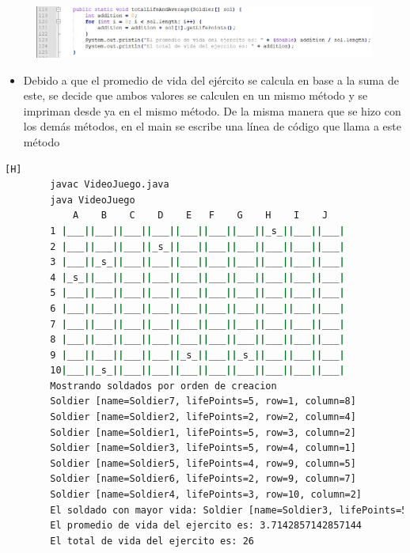 \documentclass{article}
\begin{document}
		
	\begin{figure}[H]
		\centering
		\includegraphics[width=1.09\textwidth,keepaspectratio]{img/8.jpg}
	\end{figure}	
		
	\begin{itemize}	
		\item Debido a que el promedio de vida del ejército se calcula en base a la suma de este, se decide que ambos valores se calculen en un mismo método y se impriman desde ya en el mismo método. De la misma manera que se hizo con los demás métodos, en el main se escribe una línea de código que llama a este método 
	\end{itemize}	
		
	\begin{lstlisting}[language=bash,caption={ Compilando y probando el método totaLifeAndAverage y demás}][H]
		javac VideoJuego.java
		java VideoJuego
		    A    B    C    D    E   F    G    H    I    J
		1 |___||___||___||___||___||___||___||_s_||___||___|
		2 |___||___||___||_s_||___||___||___||___||___||___|
		3 |___||_s_||___||___||___||___||___||___||___||___|
		4 |_s_||___||___||___||___||___||___||___||___||___|
		5 |___||___||___||___||___||___||___||___||___||___|
		6 |___||___||___||___||___||___||___||___||___||___|
		7 |___||___||___||___||___||___||___||___||___||___|
		8 |___||___||___||___||___||___||___||___||___||___|
		9 |___||___||___||___||_s_||___||_s_||___||___||___|
		10|___||_s_||___||___||___||___||___||___||___||___|
		Mostrando soldados por orden de creacion
		Soldier [name=Soldier7, lifePoints=5, row=1, column=8]
		Soldier [name=Soldier2, lifePoints=2, row=2, column=4]
		Soldier [name=Soldier1, lifePoints=5, row=3, column=2]
		Soldier [name=Soldier3, lifePoints=5, row=4, column=1]
		Soldier [name=Soldier5, lifePoints=4, row=9, column=5]
		Soldier [name=Soldier6, lifePoints=2, row=9, column=7]
		Soldier [name=Soldier4, lifePoints=3, row=10, column=2]
		El soldado con mayor vida: Soldier [name=Soldier3, lifePoints=5, row=4, column=1]
		El promedio de vida del ejercito es: 3.7142857142857144
		El total de vida del ejercito es: 26	
	\end{lstlisting}
		
\end{document}
